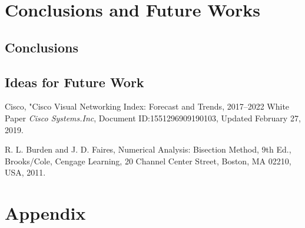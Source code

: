 \documentclass[12pt]{report}
\begin{document}
\lipsum[2-4]



\chapter{Conclusions and Future Works}

\section{Conclusions}



\lipsum[2-4]



\section{Ideas for Future Work}















%




\begin{thebibliography}{1}

Cisco, "Cisco Visual Networking Index: Forecast and Trends, 2017–2022 White Paper \emph{Cisco Systems.Inc}, Document ID:1551296909190103, Updated February 27, 2019.

 R. L. Burden and J. D. Faires, Numerical Analysis: Bisection Method, 9th Ed., Brooks/Cole, Cengage Learning, 20 Channel Center Street, Boston, MA 02210, USA, 2011.

\end{thebibliography}






\appendix

\chapter{Appendix}

\lipsum[2-3]
\end{document}
